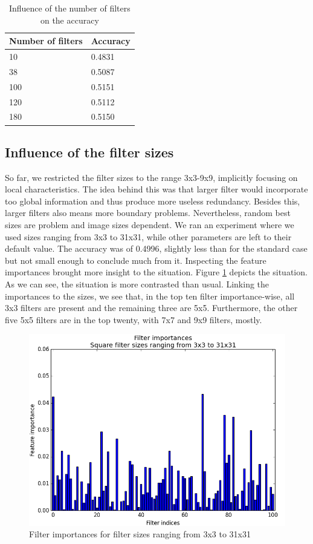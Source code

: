 \documentclass[a4paper]{report}
\newlength{\larg}
\begin{document}
	\begin{table}
		\centering
			\begin{tabular}{l|l}
			\hline
			Number of filters & Accuracy \\
			\hline \hline
			10  & 0.4831 \\
			38 & 0.5087 \\
			100 & 0.5151 \\
			120 & 0.5112 \\
			180 & 0.5150 \\
			\hline
			\end{tabular}
		\caption{\label{tab:AccFNbFilt}Influence of the number of filters on the accuracy}
	\end{table}
	
	
	\subsection{Influence of the filter sizes}
	So far, we restricted the filter sizes to the range 3x3-9x9, implicitly focusing on local characteristics. The idea behind this was that larger filter would incorporate too global information and thus produce more useless redundancy. Besides this, larger filters also means more boundary problems. Nevertheless, random best sizes are problem and image sizes dependent. 
	We ran an experiment where we used sizes ranging from 3x3 to 31x31, while other parameters are left to their default value. The accuracy was of 0.4996, slightly less than for the standard case but not small enough to conclude much from it. Inspecting the feature importances brought more insight to the situation. Figure \ref{fig:FIBigFilters} depicts the situation. As we can see, the situation is more contrasted than usual. Linking the importances to  the sizes, we see that, in the top ten filter importance-wise, all 3x3 filters are present and the remaining three are 5x5. Furthermore, the other five 5x5 filters are in the top twenty, with 7x7 and 9x9 filters, mostly.
	
	\begin{figure}
		\centering
			\includegraphics[width=1.0\textwidth]{images/FIBigFilters.png}
		\caption{\label{fig:FIBigFilters}Filter importances for filter sizes ranging from 3x3 to 31x31}
	\end{figure}
	
\end{document}
